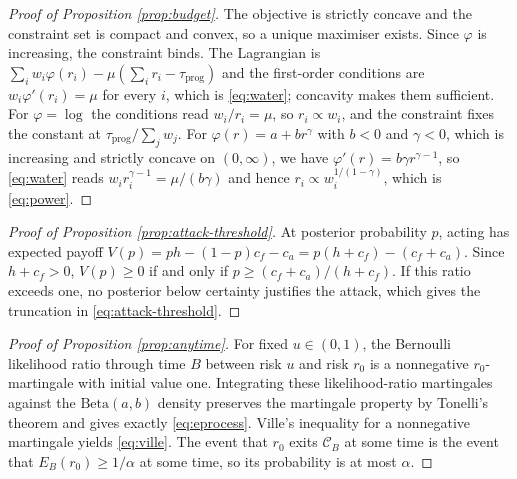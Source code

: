 \documentclass[11pt,a4paper]{article}
\theoremstyle{plain}
\theoremstyle{definition}
\begin{document}
\begin{proof}[Proof of Proposition \ref{prop:budget}]
The objective is strictly concave and the constraint set is compact and convex,
so a unique maximiser exists. Since $\varphi$ is increasing, the constraint
binds. The Lagrangian is $\sum_i w_i\varphi(r_i) - \mu(\sum_i r_i -
\tau_{\mathrm{prog}})$ and the first-order conditions are $w_i\varphi'(r_i) =
\mu$ for every $i$, which is \eqref{eq:water}; concavity makes them sufficient.
For $\varphi = \log$ the conditions read $w_i / r_i = \mu$, so $r_i \propto
w_i$, and the constraint fixes the constant at $\tau_{\mathrm{prog}}/\sum_j
w_j$. For $\varphi(r) = a + b r^{\gamma}$ with $b < 0$ and $\gamma < 0$, which
is increasing and strictly concave on $(0,\infty)$, we have $\varphi'(r) = b
\gamma r^{\gamma - 1}$, so \eqref{eq:water} reads $w_i r_i^{\gamma - 1} =
\mu / (b\gamma)$ and hence $r_i \propto w_i^{1/(1-\gamma)}$, which is
\eqref{eq:power}.
\end{proof}

\begin{proof}[Proof of Proposition \ref{prop:attack-threshold}]
At posterior probability $p$, acting has expected payoff
$V(p)=ph-(1-p)c_f-c_a=p(h+c_f)-(c_f+c_a)$. Since $h+c_f>0$,
$V(p)\ge0$ if and only if $p\ge(c_f+c_a)/(h+c_f)$. If this ratio exceeds
one, no posterior below certainty justifies the attack, which gives the truncation
in \eqref{eq:attack-threshold}.
\end{proof}

\begin{proof}[Proof of Proposition \ref{prop:anytime}]
For fixed $u\in(0,1)$, the Bernoulli likelihood ratio through time $B$ between
risk $u$ and risk $r_0$ is a nonnegative $r_0$-martingale with initial value
one. Integrating these likelihood-ratio martingales against the
$\mathrm{Beta}(a,b)$ density preserves the martingale property by Tonelli's
theorem and gives exactly \eqref{eq:eprocess}. Ville's inequality for a
nonnegative martingale yields \eqref{eq:ville}. The event that $r_0$ exits
$\mathcal C_B$ at some time is the event that $E_B(r_0)\ge1/\alpha$ at some
time, so its probability is at most $\alpha$.
\end{proof}
\end{document}
